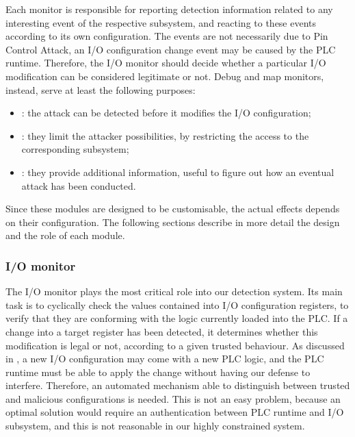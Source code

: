 Each monitor is responsible for reporting detection information related to any interesting event of the respective subsystem,
and reacting to these events according to its own configuration. The events are not necessarily due to Pin Control Attack,
\eg an I/O configuration change event may be caused by the PLC runtime.
Therefore, the I/O monitor should decide whether a particular I/O modification can be considered legitimate or not.
Debug and map monitors, instead, serve at least the following purposes:
\begin{itemize}
	\item {}: the attack can be detected before it modifies the I/O configuration;
	\item {}: they limit the attacker possibilities, by restricting the access to the corresponding subsystem;
	\item {}: they provide additional information, useful to figure out how an eventual attack has been conducted.
\end{itemize}
Since these modules are designed to be customisable, the actual effects depends on their configuration.
The following sections describe in more detail the design and the role of each module.


\subsubsection{I/O monitor}

The I/O monitor plays the most critical role into our detection system.
Its main task is to cyclically check the values contained into I/O configuration registers, to verify that they are conforming with the logic currently loaded into the PLC.
If a change into a target register has been detected, it determines whether this modification is legal or not, according to a given trusted behaviour.
As discussed in , a new I/O configuration may come with a new PLC logic, and the PLC runtime must be able to apply the change without
having our defense to interfere.
Therefore, an automated mechanism able to distinguish between trusted and malicious configurations is needed.
This is not an easy problem, because an optimal solution would require an authentication between PLC runtime and I/O subsystem,
and this is not reasonable in our highly constrained system.

